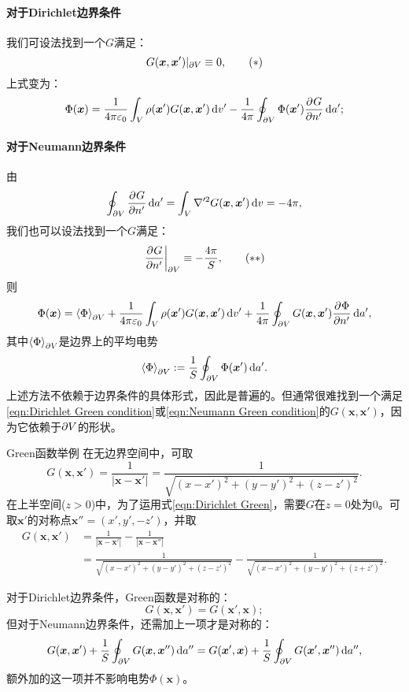\paragraph{对于Dirichlet边界条件}我们可设法找到一个$G$满足：
\begin{equation}
    \label{eqn:Dirichlet Green condition}
    G(\bm x,\bm x')|_{\partial V}\equiv 0,\tag{$\ast$}
\end{equation}
上式变为：
\begin{align}
    \label{eqn:Dirichlet Green}
    \Phi(\bm x)=\frac1{4\pi\varepsilon_0}\int_V\rho(\bm x')G(\bm x,\bm x')\mathop{}\!\mathrm{d} v'-\frac1{4\pi}\oint_{\partial V}\Phi(\bm x')\frac{\partial^{{}}G}{\partial{n'}^{{}}}\mathop{}\!\mathrm{d} a';
\end{align}

\paragraph{对于Neumann边界条件}由
\[
    \oint_{\partial V}\frac{\partial^{{}}G}{\partial{n'}^{{}}}\mathop{}\!\mathrm{d} a'=\int_V\nabla'^2G(\bm x,\bm x')\mathop{}\!\mathrm{d} v=-4\pi,
\]
我们也可以设法找到一个$G$满足：
\begin{equation}
    \label{eqn:Neumann Green condition}
    \left.\frac{\partial^{{}}G}{\partial{n'}^{{}}}\right\rvert_{\partial V}\equiv-\frac{4\pi}S,\tag{$\ast\ast$}
\end{equation}
则
\begin{align}
    \label{eqn:Neumann Green}
    \Phi(\bm x)=\left\langle \Phi\right\rangle_{\partial V}+\frac1{4\pi\varepsilon_0}\int_V\rho(\bm x')G(\bm x,\bm x')\mathop{}\!\mathrm{d} v'+\frac1{4\pi}\oint_{\partial V}G(\bm x,\bm x')\frac{\partial^{{}}\Phi}{\partial{n'}^{{}}}\mathop{}\!\mathrm{d} a',
\end{align}
其中$\left\langle \Phi\right\rangle_{\partial V}$是边界上的平均电势
\[
    \left\langle \Phi\right\rangle_{\partial V}:=\frac1S\oint_{\partial V}\Phi(\bm x')\mathop{}\!\mathrm{d} a'.
\]
上述方法不依赖于边界条件的具体形式，因此是普遍的。但通常很难找到一个满足\eqref{eqn:Dirichlet Green condition}或\eqref{eqn:Neumann Green condition}的$G(\bm x, \bm x')$，因为它依赖于$\partial V$的形状。
\begin{example}{Green函数举例}{}
    在无边界空间中，可取
    \[
        G(\bm x,\bm x')=\frac1{|\bm x-\bm x'|}=\frac1{\sqrt{(x-x')^2+(y-y')^2+(z-z')^2}}.
    \]
    在上半空间($z>0$)中，为了运用式\eqref{eqn:Dirichlet Green}，需要$G$在$z=0$处为0。可取$\bm x'$的对称点$\bm x''=(x',y',-z')$，并取
    \begin{align*}
        G(\bm x,\bm x')&=\frac1{|\bm x-\bm x'|}-\frac1{|\bm x-\bm x''|}\\
        &=\frac1{\sqrt{(x-x')^2+(y-y')^2+(z-z')^2}}-\frac1{\sqrt{(x-x')^2+(y-y')^2+(z+z')^2}}.
    \end{align*}
\end{example}
对于Dirichlet边界条件，Green函数是对称的：
\[
    G(\bm x,\bm x')=G(\bm x',\bm x);
\]
但对于Neumann边界条件，还需加上一项才是对称的：
\[
    G(\bm x,\bm x')+\frac1S\oint_{\partial V}G(\bm x,\bm x'')\mathop{}\!\mathrm{d} a''=G(\bm x',\bm x)+\frac1S\oint_{\partial V}G(\bm x',\bm x'')\mathop{}\!\mathrm{d} a'',
\]
额外加的这一项并不影响电势$\Phi(\bm x)$。

